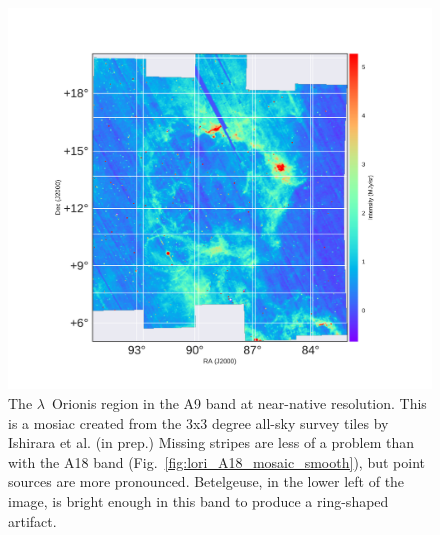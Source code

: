             \begin{figure}
              \includegraphics[width=\textwidth,trim={2.5cm 2cm 3.0cm 2cm},clip]{../Plots/ch_lori/lori_A9_mosaic_smooth.pdf}
              \centering
              \caption{The $\lambda$~Orionis region in the A9 band at near-native resolution. This is a mosiac created from the 3x3 degree all-sky survey tiles by Ishirara et al. (in prep.) Missing stripes are less of a problem than with the A18 band (Fig.~\ref{fig:lori_A18_mosaic_smooth}), but point sources are more pronounced. Betelgeuse, in the lower left of the image, is bright enough in this band to produce a ring-shaped artifact. }
              \label{fig:lori_A9_mosaic_smooth}
            \end{figure}
